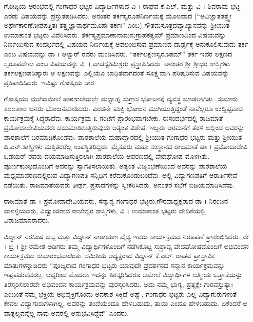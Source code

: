 {ಗೋಷ್ಠಿಯ ಆರಂಭದಲ್ಲಿ ಗಂಗಾಧರ ಭಟ್ಟರ ವಿದ್ಯಾರ್ಥಿಗಳಾದ ವಿ । ರಾಘವ ಕೆ.ಎಲ್, ಮತ್ತು ವಿ । ಶಿವರಾಮ ಭಟ್ಟ ಎರಡು ವಿಷಯವನ್ನು \-ಪ್ರಸ್ತುತಪಡಿಸಿದರು. ಅನಂತರ ತರ್ಕಸ್ವರೂಪನಿರ್ಣಯಕ್ಕೆ  ಮೂಲವಾದ (“ಅವಿಜ್ಞಾತತತ್ತ್ವೇ ಅರ್ಥೇ\break ಕಾರಣೋಪಪತ್ತಿತಃ ತತ್ತ್ವಜ್ಞಾನಾರ್ಥಮೂಹಃ ತರ್ಕಃ” ಎಂಬ) ಗೌತಮಸೂತ್ರದ\break ವ್ಯಾಖ್ಯಾನವನ್ನು ಶ್ರೀಯುತ ಉಮಾಕಾಂತ ಭಟ್ಟರು ವಿವರಿಸಿದರು. ತರ್ಕಸ್ಯ\break ಪ್ರಮಾಣಾನಾಮನುಗ್ರಾಹಕತ್ವಮ್ \enginline{-} ಪ್ರಮಾಣದಿಂದ ವಿಷಯವನ್ನು ನಿರ್ಣಯಿಸುವ ಸಂದರ್ಭದಲ್ಲಿ ವಿಷಯದ  ನಿರ್ಣಯಕ್ಕೆ ಅವಲಂಬಿಸುವ ಪ್ರಮಾಣದ ದಾರ್ಢ್ಯಕ್ಕೆ  ಅನುಕೂಲಿಸುವುದು ತರ್ಕ ಎಂಬ ವಿಷಯವನ್ನು ಡಾ । ಆಳ್ವಾರ್ ರವರು \hbox{ಮಂಡಿಸಿದರು.} “ತರ್ಕಲಕ್ಷಣಸ್ವರೂಪಮ್” \enginline{-} ತರ್ಕ ಇದರ ಲಕ್ಷಣದ ಸ್ವರೂಪವೇನು ಎಂಬ ವಿಷಯವನ್ನು ವಿ~। ವಾಚಸ್ಪತಿಮಿಶ್ರರು ಪ್ರಸ್ತಾಪಿಸಿದರು. ಅನಂತರ ಶ್ರೀ ಶ್ರೀಧರ ಶಾಸ್ತ್ರಿಗಳು ತರ್ಕಲಕ್ಷಣ\-ಪರಿಷ್ಕಾರಃ \enginline{-}ಆ ಲಕ್ಷಣವನ್ನು  ಎಲ್ಲಿಯೂ ಬಾಧಿತವಾಗದಂತೆ ಸೂಕ್ಷ್ಮವಾಗಿ ಪರಿಷ್ಕರಿಸುವ ವಿಷಯವನ್ನು ಪ್ರತಿಪಾದಿಸಿದರು. ಇವಿಷ್ಟು ಗೋಷ್ಠಿಯ ಸಾರ.

ಗೋಷ್ಠಿಯು ಮುಗಿದಮೇಲೆ ಪಾಠಶಾಲೆಯಲ್ಲೇ ಮಧ್ಯಾಹ್ನ ಸುಗ್ರಾಸ ಭೋಜನಕ್ಕೆ ವ್ಯವಸ್ಥೆ ಮಾಡಲಾಗಿತ್ತು. ಸುಮಾರು ೨೦೦\enginline{-}೨೫೦ ಜನರು  ಭೋಜನಮಾಡಿದರು. ಎರಡನೇ ಪಂಕ್ತಿ ಭೋಜನ ಮುಗಿಯುತ್ತಿದ್ದಂತೆ ನಾವೆಲ್ಲರೂ ಉದ್ದಿಷ್ಟವಾದ ಕಾರ್ಯ\-ಕ್ರಮಕ್ಕೆ ಸಿದ್ಧರಾದೆವು. ಕಾರ್ಯಕ್ರಮ ೩ ಗಂಟೆಗೆ ಪ್ರಾರಂಭವಾಗಬೇಕು. ಈ\break ಸಂದರ್ಭದಲ್ಲಿ ರಾಜಮಾತೆ ಪ್ರಮೋದಾದೇವಿಯವರು ದಯಮಾಡಿಸುತ್ತಿರುವುದು ಅತ್ಯಂತ ವಿಶೇಷ. ಇಬ್ಬರು ಅರಮನೆಗೆ ತೆರಳಿ ಅಲ್ಲಿಂದ  ಅವರನ್ನು ಪಾಠಶಾಲೆಗೆ ಬರ\-ಮಾಡಿ\-ಕೊಂಡೆವು. ಪಾಠಶಾಲೆಯ ಮಹಾದ್ವಾರದಲ್ಲಿ ಶ್ರೀಯುತ ಗಂಗಾಧರ ಭಟ್ಟರು ಮತ್ತು ಶ್ರೀಯುತ ಪಿ.ಎನ್.ಶಾಸ್ತ್ರಿಗಳು ಮತ್ತಿತರರೆಲ್ಲ ಉಪಸ್ಥಿತರಿದ್ದರು. ಮೈಸೂರು ಮಹಾ ಸಂಸ್ಥಾನದ ರಾಜಮಾತೆ ಡಾ । ಪ್ರಮೋದಾದೇವಿ ಒಡೆಯರ್ ರವರು ದಯಮಾಡಿಸುತ್ತಿರಲಾಗಿ ಪಾಠಶಾಲೆಯ ಆವರಣದಲ್ಲಿ ವೇದಘೋಷ ಮೊಳಗಿತು. ಪೂರ್ಣ\-ಕುಂಭದೊಂದಿಗೆ ಅವರನ್ನು  ಸ್ವಾಗತಿಸಲಾಯಿತು. ಅತ್ಯಂತ ವಿಜೃಂಭಣೆಯಿಂದ ಅವರನ್ನು ಪಾಠಶಾಲೆಯ ಮಧ್ಯಮಾವರಣದಲ್ಲಿರುವ ವಿದ್ಯಾಗಣಪತಿ ಸನ್ನಿಧಿಗೆ ಕರೆದುಕೊಂಡುಬಂದೆವು. ಅಲ್ಲಿ ವಿದ್ಯಾಗಣಪತಿಗೆ ಆರಾರ್ತಿಸೇವೆ ನಡೆಯಿತು. ರಾಜಮಾತೆಯವರು ತೀರ್ಥ, ಪ್ರಸಾದಗಳನ್ನು ಸ್ವೀಕರಿಸಿದರು. ಅನಂತರ ಸಭೆಗೆ ಬಿಜಯಮಾಡಿಸಿದೆವು. 

ರಾಜಮಾತೆ ಡಾ । ಪ್ರಮೋದಾದೇವಿಯವರು, ಸನ್ಮಾನ್ಯ ಗಂಗಾಧರ ಭಟ್ಟರು,\break ಗೌರವಾಧ್ಯಕ್ಷರಾದ ಡಾ । ನಿರಂಜನ ವಾನಳ್ಳಿಯವರು, ವಿದ್ವಾಂಸರಾದ ರಾಜೇಶ್ವರ ಶಾಸ್ತ್ರಿಗಳು, ವಿ । ಉಮಾಕಾಂತ ಭಟ್ಟರು ವೇದಿಕೆಯಲ್ಲಿ ವಿರಾಜಮಾನರಾದರು.

ವಿದ್ವಾನ್ ನರಸಿಂಹ ಭಟ್ಟ ಮತ್ತು ವಿದ್ವಾನ್ ನಾರಾಯಣ ವೈದ್ಯ ಇವರು ಕಾರ್ಯ\-ಕ್ರಮದ ನಿರೂಪಣೆ ಪ್ರಾರಂಭಿಸಿದರು. ವೇ । ಬ್ರ । ಶ್ರೀ ರಮೇಶ ಅಡಿಗರು ತಮ್ಮ ವಿದ್ಯಾರ್ಥಿಗಳೊಂದಿಗೆ ನಡೆಸಿಕೊಟ್ಟ ಸುಶ್ರಾವ್ಯ ವೇದಘೋಷದೊಂದಿಗೆ ಅಭಿವಂದನ ಕಾರ್ಯಕ್ರಮದ ಶುಭಾರಂಭವಾಯಿತು. ಸಮಿತಿಯ ಅಧ್ಯಕ್ಷರಾದ ವಿದ್ವಾನ್ ಕೆ.ಎಲ್. ರಾಘವ ಪ್ರಾಸ್ತಾವಿಕ ಮಾತುಗಳನ್ನಾಡಿದರು \enginline{-} “ಪೂಜ್ಯರಾದ ಗಂಗಾಧರ ಭಟ್ಟರು ಯಾವುದೇ ಪ್ರದರ್ಶನದ ಸನ್ಮಾನ ಕಾರ್ಯಕ್ರಮವನ್ನು ಇಷ್ಟ\-ಪಡುವವರಲ್ಲ. ಆದ್ದರಿಂದ ಮೊದಲು ಇದನ್ನು ತಿರಸ್ಕರಿಸಿದರೂ ಆಮೇಲೆ ವಿದ್ಯಾರ್ಥಿಗಳ ಆತ್ಮೀಯ ಒತ್ತಾಸೆಯನ್ನು ತಿರಸ್ಕರಿಸಲಾರದೇ ಅಭಿವಂದನ ಕಾರ್ಯಕ್ರಮವನ್ನು ಪುರಸ್ಕರಿಸಿದರು. ಅದು ನಮ್ಮ ಭಾಗ್ಯ, ಪ್ರತ್ಯಕ್ಷೇ ಗುರವಸ್ತುತ್ಯಾಃ ಎಂಬಂತೆ ನಮ್ಮ ಭಕ್ತಿಯ ಅಭಿವ್ಯಕ್ತಿಗೊಂದು ಅವಕಾಶ  ಸಿಕ್ಕಿದೆ ಅಷ್ಟೆ , ಗಂಗಾಧರ ಭಟ್ಟರು ಎಲ್ಲ ವಿದ್ಯಾಗುರುಗಳಂತೆ ಕೇವಲ ವಿದ್ಯಾಗುರು\-ಗಳಾಗಿಲ್ಲ, ಅವರನ್ನು ತಂದೆಯೆಂದೂ ಹೇಳಬಹುದು, ತಾಯಿ ಎಂದೂ ಹೇಳಬಹುದು. ಏಕೆಂದರೆ ಆ ವಾತ್ಸಲ್ಯವನ್ನೆಲ್ಲ ನಾವು ಅವರಲ್ಲಿ ಅನುಭವಿ\-ಸಿದ್ದೆವೆ” ಎಂದರು. 

}

